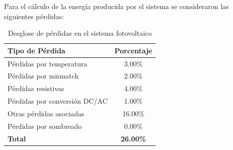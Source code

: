 Para el cálculo de la energía producida por el sistema se consideraron las siguientes pérdidas:

\begin{table}[H]
    \centering
    \caption{Desglose de pérdidas en el sistema fotovoltaico}
    \begin{tabular}{lc}
    \toprule
    \textbf{Tipo de Pérdida} & \textbf{Porcentaje} \\
    \midrule
    Pérdidas por temperatura & 3.00\% \\
    Pérdidas por mismatch & 2.00\% \\
    Pérdidas resistivas & 4.00\% \\
    Pérdidas por conversión DC/AC & 1.00\% \\
    Otras pérdidas asociadas & 16.00\% \\
    Pérdidas por sombreado & 0.00\% \\
    \midrule
    \textbf{Total} & \textbf{26.00\%} \\
    \bottomrule
    \end{tabular}
\end{table}
